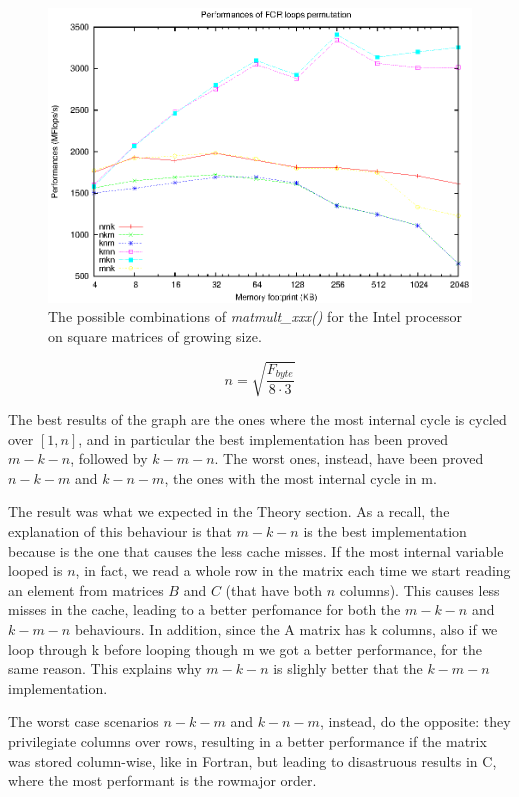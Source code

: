 \begin{figure}[here]
\centering
\includegraphics[width=\textwidth]{results/permutations.eps}
\caption{The possible combinations of \emph{matmult\_xxx()} for the Intel processor on square matrices of growing size.}
\label{fig:permutations}
\end{figure}

$$
n = \sqrt{\frac{F_{byte}}{8 \cdot 3} }
$$

The best results of the graph are the ones where the most internal cycle is cycled over $[1,n]$, and in particular the best implementation has been proved $m-k-n$, followed by $k-m-n$. The worst ones, instead, have been proved $n-k-m$ and $k-n-m$, the ones with the most internal cycle in m.

The result was what we expected in the Theory section. As a recall, the explanation of this behaviour is that $m-k-n$ is the best implementation because is the one that causes the less cache misses. If the most internal variable looped is $n$, in fact, we read a whole row in the matrix each time we start reading an element from matrices $B$ and $C$ (that have both $n$ columns). This causes less misses in the cache, leading to a better perfomance for both the $m-k-n$ and $k-m-n$ behaviours. In addition, since the A matrix has k columns, also if we loop through k before looping though m we got a better performance, for the same reason. This explains why $m-k-n$ is slighly better that  the $k-m-n$ implementation.

The worst case scenarios  $n-k-m$ and $k-n-m$, instead, do the opposite: they privilegiate columns over rows, resulting in a better performance if the matrix was stored column-wise, like in Fortran, but leading to disastruous results in C, where the most performant is the rowmajor order.

